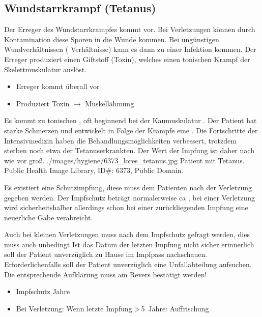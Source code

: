 \subsection{Wundstarrkrampf (Tetanus)}
\label{topic:Wundstarrkrampf}

{\TxBeschreibung}
{Der Erreger des Wundstarrkrampfes kommt  vor. Bei
Verletzungen können durch Kontamination diese Sporen in die
Wunde kommen. Bei ungünstigen Wundverhältnissen
( Verhältnisse) kann es dann zu einer
Infektion kommen. Der Erreger produziert
einen Giftstoff (Toxin), welches einen tonischen Krampf der
Skelettmuskulatur auslöst. 

}
{
\begin{itemize}
  \item Erreger kommt überall vor
  \item Produziert Toxin $\rightarrow$ Muskellähmung
\end{itemize}
}
{}
{}
{}



{%
Es kommt zu tonischen , oft beginnend bei der
Kaumuskulatur . Der Patient hat starke Schmerzen
und entwickelt in Folge der Krämpfe eine . 
Die Fortschritte der
Intensivmedizin haben die Behandlungsmöglichkeiten
verbessert, trotzdem sterben noch etwa \PC*
der Tetanuserkrankten. Der Wert der
Impfung ist daher nach wie vor groß.
}
{
}
{./images/hygiene/6373_lores_tetanus.jpg}
{Patient mit Tetanus.}
{Public Health Image Library, ID\#: 6373, Public Domain.}

{
\label{topic:tetanus-impfschutz}
Es existiert eine Schutzimpfung, diese muss dem Patienten
 nach der Verletzung gegeben werden. Der
Impfschutz beträgt normalerweise ca , bei einer
Verletzung wird sicherheitshalber allerdings schon bei einer
 zurückliegenden Impfung eine
neuerliche Gabe verabreicht.

Auch bei kleinen Verletzungen muss nach dem Impfschutz
gefragt werden, dies muss auch unbedingt  Ist das Datum der letzten Impfung nicht sicher
erinnerlich soll der Patient unverzüglich zu Hause im
Impfpass nachschauen. Erforderlichenfalls soll der Patient
unverzüglich eine Unfallabteilung aufsuchen.
Die entsprechende Aufklärung muss am Revers bestätigt werden!
}
{
\begin{itemize}
  \item Impfschutz  Jahre
  \item Bei Verletzung: Wenn letzte Impfung >\,5~Jahre:
  Auffrischung
\end{itemize}
}
{}
{}
{}

